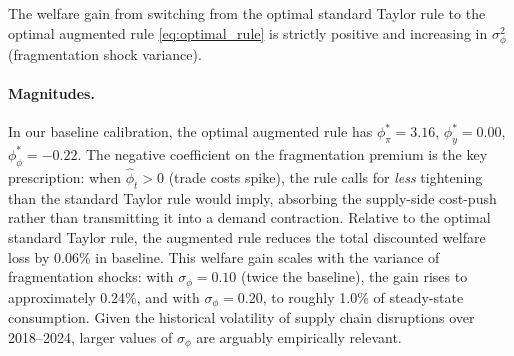 \begin{corollary}
  The welfare gain from switching from the optimal standard Taylor rule to the
  optimal augmented rule \eqref{eq:optimal_rule} is strictly positive and
  increasing in $\sigma_\phi^2$ (fragmentation shock variance).
\end{corollary}

\paragraph{Magnitudes.}
In our baseline calibration, the optimal augmented rule has
$\phi_\pi^* = 3.16$, $\phi_y^* = 0.00$, $\phi_\phi^* = -0.22$.
The negative coefficient on the fragmentation premium is the key prescription:
when $\hat\phi_t > 0$ (trade costs spike), the rule calls for \emph{less}
tightening than the standard Taylor rule would imply, absorbing the supply-side
cost-push rather than transmitting it into a demand contraction. Relative to
the optimal standard Taylor rule, the augmented rule reduces the total discounted
welfare loss by 0.06\% in baseline. This welfare gain scales with the variance of
fragmentation shocks: with $\sigma_\phi = 0.10$ (twice the baseline), the gain
rises to approximately 0.24\%, and with $\sigma_\phi = 0.20$, to roughly 1.0\%
of steady-state consumption. Given the historical volatility of supply chain
disruptions over 2018--2024, larger values of $\sigma_\phi$ are arguably
empirically relevant.
